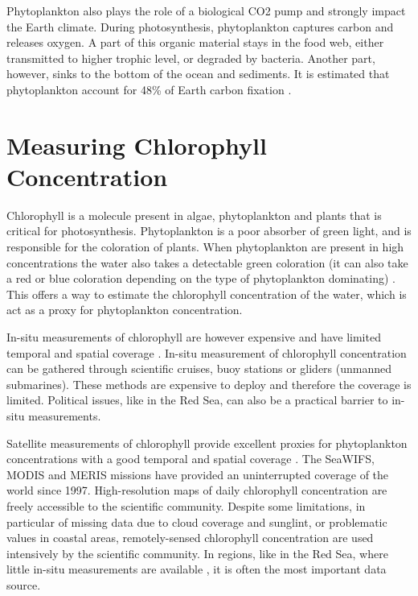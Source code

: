 Phytoplankton also plays the role of a biological CO2 pump and strongly impact the Earth climate. During photosynthesis, phytoplankton captures carbon and releases oxygen. A part of this organic material stays in the food web, either transmitted to higher trophic level, or degraded  by bacteria. Another part, however, sinks to the bottom of the ocean and sediments. It is estimated that phytoplankton account for 48\% of Earth carbon fixation \cite{Pal2014}.

\section{Measuring Chlorophyll Concentration}

Chlorophyll is a molecule present in algae, phytoplankton and plants that is critical for photosynthesis. Phytoplankton is a poor absorber of green light, and is responsible for the coloration of plants. When phytoplankton are present in high concentrations the water also takes a detectable green coloration (it can also take a red or blue coloration depending on the type of phytoplankton dominating) \cite{Robinson2010}. This offers a way to estimate the chlorophyll concentration of the water, which is act as a proxy for phytoplankton concentration.

In-situ measurements of chlorophyll are however expensive and have limited temporal and spatial coverage \cite{Robinson2010}. In-situ measurement of chlorophyll concentration can be gathered through scientific cruises, buoy stations or gliders (unmanned submarines). These methods are expensive to deploy and therefore the coverage is limited. Political issues, like in the Red Sea, can also be a practical barrier to in-situ measurements.

Satellite measurements of chlorophyll provide excellent proxies for phytoplankton concentrations with a good temporal and spatial coverage \cite{Robinson2010}. The SeaWIFS, MODIS and MERIS missions have provided an uninterrupted coverage of the world since 1997. High-resolution maps of daily chlorophyll concentration are freely accessible to the scientific community. Despite some limitations, in particular of missing data due to cloud coverage and sunglint, or problematic values in coastal areas, remotely-sensed chlorophyll concentration are used intensively by the scientific community. In regions, like in the Red Sea, where little in-situ measurements are available \cite{Raitsos2013}, it is often the most important data source.

